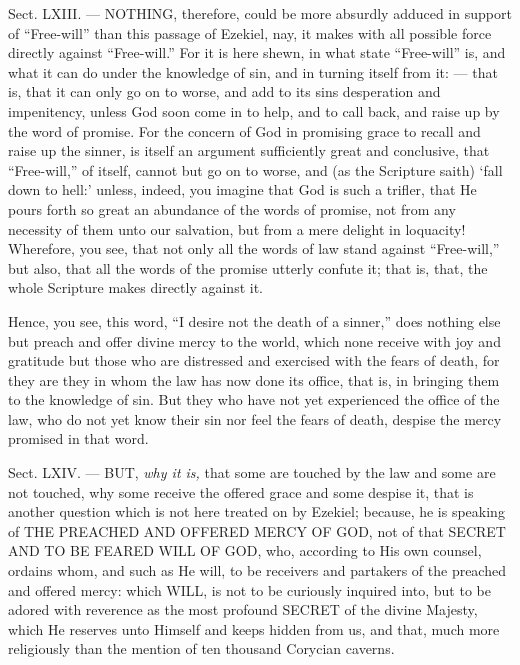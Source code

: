 
Sect. LXIII. — NOTHING, therefore, could be more absurdly adduced in support of “Free-will” than this passage of Ezekiel, nay, it makes with all possible force directly against “Free-will.” For it is here shewn, in what state “Free-will” is, and what it can do under the knowledge of sin, and in turning itself from it: — that is, that it can only go on to worse, and add to its sins desperation and impenitency, unless God soon come in to help, and to call back, and raise up by the word of promise. For the concern of God in promising grace to recall and raise up the sinner, is itself an argument sufficiently great and conclusive, that “Free-will,” of itself, cannot but go on to worse, and (as the Scripture saith) ‘fall down to hell:’ unless, indeed, you imagine that God is such a trifler, that He pours forth so great an abundance of the words of promise, not from any necessity of them unto our salvation, but from a mere delight in loquacity! Wherefore, you see, that not only all the words of law stand against “Free-will,” but also, that all the words of the promise utterly confute it; that is, that, the whole Scripture makes directly against it.

Hence, you see, this word, “I desire not the death of a sinner,” does nothing else but preach and offer divine mercy to the world, which none receive with joy and gratitude but those who are distressed and exercised with the fears of death, for they are they in whom the law has now done its office, that is, in bringing them to the knowledge of sin. But they who have not yet experienced the office of the law, who do not yet know their sin nor feel the fears of death, despise the mercy promised in that word.


Sect. LXIV. — BUT, \emph{why it is, }that some are touched by the law and some are not touched, why some receive the offered grace and some despise it, that is another question which is not here treated on by Ezekiel; because, he is speaking of \textsc{THE PREACHED AND OFFERED MERCY OF GOD}, not of that \textsc{SECRET AND TO BE FEARED WILL OF GOD}, who, according to His own counsel, ordains whom, and such as He will, to be receivers and partakers of the preached and offered mercy: which WILL, is not to be curiously inquired into, but to be adored with reverence as the most profound \textsc{SECRET }of the divine Majesty, which He reserves unto Himself and keeps hidden from us, and that, much more religiously than the mention of ten thousand Corycian caverns.

